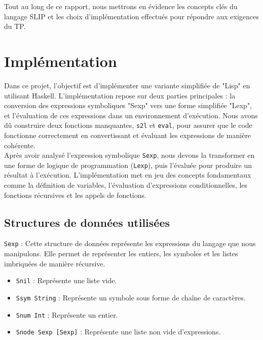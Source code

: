 \documentclass{article}
\begin{document}
Tout au long de ce rapport, nous mettrons en évidence les concepts clés du langage SLIP et les choix d'implémentation effectués pour répondre aux exigences du TP. \\

\section{Implémentation}
Dans ce projet, l’objectif est d’implémenter une variante simplifiée de "Lisp" en utilisant Haskell. L’implémentation repose sur deux parties principales : la conversion des expressions symboliques "Sexp" vers une forme simplifiée "Lexp", et l’évaluation de ces expressions dans un environnement d’exécution. Nous avons dû construire deux fonctions manquantes, \texttt{s2l} et \texttt{eval}, pour assurer que le code fonctionne correctement en convertissant et évaluant les expressions de manière cohérente.\\

Après avoir analysé l’expression symbolique \texttt{Sexp}, nous devons la transformer en une forme de logique de programmation (\texttt{Lexp}), puis l'évaluée pour produire un résultat à l’exécution. L'implémentation met en jeu des concepts fondamentaux comme la définition de variables, l'évaluation d'expressions conditionnelles, les fonctions récursives et les appels de fonctions.

\subsection{Structures de données utilisées}

\texttt{Sexp} : Cette structure de données représente les expressions du langage que nous manipulons. Elle permet de représenter les entiers, les symboles et les listes imbriquées de manière récursive.
\begin{itemize}
    \item \texttt{Snil} : Représente une liste vide.
    \item \texttt{Ssym String} : Représente un symbole sous forme de chaîne de caractères.
    \item \texttt{Snum Int} : Représente un entier.
    \item \texttt{Snode Sexp [Sexp]} : Représente une liste non vide d’expressions.
\end{itemize}
\end{document}
